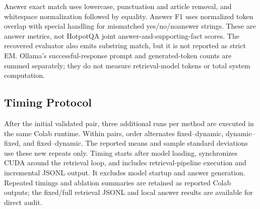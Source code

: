 \documentclass[conference]{IEEEtran}
\begin{document}
Answer exact match uses lowercase, punctuation and article removal, and whitespace normalization followed by equality. Answer F1 uses normalized token overlap with special handling for mismatched yes/no/noanswer strings. These are answer metrics, not HotpotQA joint answer-and-supporting-fact scores. The recovered evaluator also emits substring match, but it is not reported as strict EM. Ollama's successful-response prompt and generated-token counts are summed separately; they do not measure retrieval-model tokens or total system computation.

\subsection{Timing Protocol}
After the initial validated pair, three additional runs per method are executed in the same Colab runtime. Within pairs, order alternates fixed--dynamic, dynamic--fixed, and fixed--dynamic. The reported means and sample standard deviations use these new repeats only. Timing starts after model loading, synchronizes CUDA around the retrieval loop, and includes retrieval-pipeline execution and incremental JSONL output. It excludes model startup and answer generation. Repeated timings and ablation summaries are retained as reported Colab outputs; the fixed/full retrieval JSONL and local answer results are available for direct audit.
\end{document}

